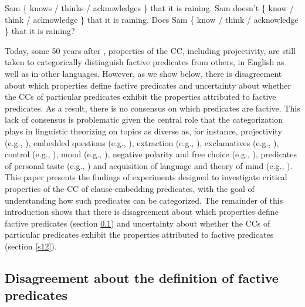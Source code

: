 \documentclass[11pt,fleqn]{article}
\newcommand{\6}{\mbox{$[\hspace*{-.6mm}[$}}
\newcommand{\9}{\mbox{$]\hspace*{-.6mm}]$}}
\begin{document}
\begin{exe}
\ex\label{kk1}
\begin{xlist}
\ex Sam \{ knows / thinks / acknowledges \} that it is raining.
\ex Sam doesn't \{ know / think / acknowledge \} that it is raining.
\ex Does Sam \{ know / think / acknowledge \} that it is raining?
\end{xlist}
\end{exe}
Today, some 50 years after \citealt{kiparsky-kiparsky70}, properties of the CC, including projectivity, are still taken to categorically distinguish factive predicates from others, in English as well as in other languages. However, as we show below, there is disagreement about which properties define factive predicates and uncertainty about whether the CCs of particular predicates exhibit the properties attributed to factive predicates. As a result, there is no consensus on which predicates are factive. This lack of consensus is problematic given the central role that the categorization plays in linguistic theorizing on topics as diverse as, for instance, projectivity (e.g., \citealt{karttunen-peters79,vds92}), embedded questions (e.g., \citealt{hintikka1975,guerzoni-sharvit2007,spector-egre2015}), extraction (e.g., \citealt{hukari-levine1995,rooryck2000,abrusan2014}), exclamatives (e.g., \citealt{zanuttini-portner2003}), control (e.g., \citealt{landau2001}), mood (e.g., \citealt{van-gelderen2004,givon95,heycock2006,giannakidou-mari2015}), negative polarity and free choice (e.g., \citealt{giannakidou1998,giannakidou2001}), predicates of personal taste (e.g., \citealt{lasersohn2009}) and acquisition of language and theory of mind (e.g., \citealt{devillers2005}). 
This paper presents the findings of experiments designed to investigate critical properties of the CC of clause-embedding predicates, with the goal of understanding how such predicates can be categorized. The remainder of this introduction shows that there is disagreement about which properties define factive predicates (section \ref{s11}) and uncertainty about whether the CCs of particular predicates exhibit the properties attributed to factive predicates (section \ref{s12}).

\subsection{Disagreement about the definition of factive predicates}\label{s11}
\end{document}
